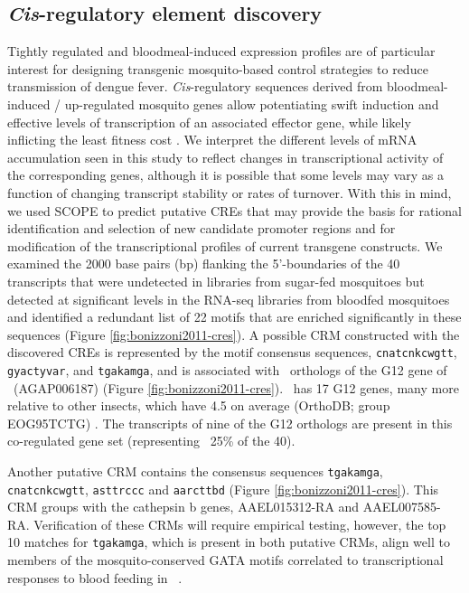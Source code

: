 \subsection{\textit{Cis}-regulatory element discovery}
Tightly regulated and bloodmeal-induced expression profiles are of particular interest for designing transgenic mosquito-based control strategies to reduce transmission of dengue fever. \textit{Cis}-regulatory sequences derived from bloodmeal-induced / up-regulated mosquito genes allow potentiating swift induction and effective levels of transcription of an associated effector gene, while likely inflicting the least fitness cost \cite{Marelli2006,Amenya2010}. We interpret the different levels of mRNA accumulation seen in this study to reflect changes in transcriptional activity of the corresponding genes, although it is possible that some levels may vary as a function of changing transcript stability or rates of turnover. With this in mind, we used \gls{SCOPE} \cite{Carlson2007} to predict putative \glspl{CRE} that may provide the basis for rational identification and selection of new candidate promoter regions and for modification of the transcriptional profiles of current transgene constructs. We examined the 2000 base pairs (bp) flanking the 5'-boundaries of the 40 transcripts that were undetected in libraries from sugar-fed mosquitoes but detected at significant levels in the RNA-seq libraries from bloodfed mosquitoes and identified a redundant list of 22 motifs that are enriched significantly in these sequences (Figure \ref{fig:bonizzoni2011-cres}). A possible \gls{CRM} constructed with the discovered \glspl{CRE} is represented by the motif consensus sequences, \texttt{cnatcnkcwgtt}, \texttt{gyactyvar}, and \texttt{tgakamga}, and is associated with \Aa\  orthologs of the G12 gene of \Ag\ (AGAP006187) (Figure \ref{fig:bonizzoni2011-cres}). \Aea\ has 17 G12 genes, many more relative to other insects, which have 4.5 on average (OrthoDB; group EOG95TCTG) \cite{Kriventseva2008}. The transcripts of nine of the G12 orthologs are present in this co-regulated gene set (representing ~25\% of the 40).

Another putative \gls{CRM} contains the consensus sequences \texttt{tgakamga}, \texttt{cnatcnkcwgtt}, \texttt{asttrccc} and \texttt{aarcttbd} (Figure \ref{fig:bonizzoni2011-cres}). This \gls{CRM} groups with the cathepsin b genes, AAEL015312-RA and AAEL007585-RA. Verification of these \glspl{CRM} will require empirical testing, however, the top 10 matches for \texttt{tgakamga}, which is present in both putative \glspl{CRM}, align well to members of the mosquito-conserved GATA motifs correlated to transcriptional responses to blood feeding in \Ag\ \cite{Sieglaff2009}.





